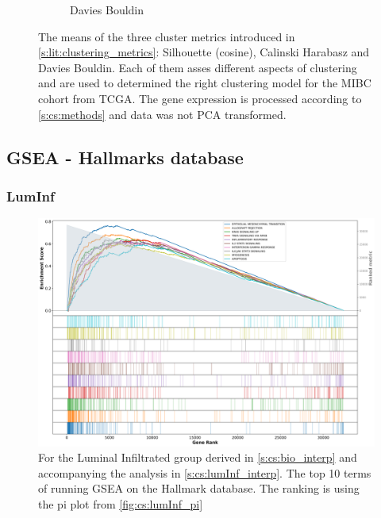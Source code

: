 \begin{figure}[!h]
\begin{subfigure}[!t]{0.6\textwidth}
        \caption{Davies Bouldin}
        \label{fig:ap:dav_boul}
    \end{subfigure}
    \caption{The means of the three cluster metrics introduced in \cref{s:lit:clustering_metrics}: Silhouette (cosine), Calinski Harabasz and Davies Bouldin. Each of them asses different aspects of clustering and are used to determined the right clustering model for the MIBC cohort from TCGA. The gene expression is processed according to \cref{s:cs:methods} and data was not PCA transformed.}
    \label{fig:ap:non_pca_metrics}
\end{figure}


\subsection{GSEA - Hallmarks database} \label{s:ap:cs:gsea_ne}

\subsubsection{LumInf}

\begin{figure}[H]    
    \centering
\includegraphics[width=1.0\textwidth,keepaspectratio]{Sections/ClusteringAnalysis/Resources/discussion/other_groups/lumInf_hallmark_10_top.png}
    \caption{For the Luminal Infiltrated group derived in \cref{s:cs:bio_interp} and accompanying the analysis in \cref{s:cs:lumInf_interp}. The top 10 terms of running GSEA on the Hallmark database. The ranking is using the pi plot from \cref{fig:cs:lumInf_pi}}
    \label{fig:ap:cs:gsea_lumInf_hallmark}
\end{figure}


